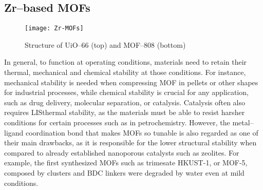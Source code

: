 \subsection{Zr--based MOFs}
\begin{figure}[!htbp]
	\centering
 	\texttt{[image: Zr-MOFs]}
	\caption{Structure of UiO--66 (top) and MOF--808 (bottom)}
	\label{fig:Zr-MOFs}
\end{figure}
In general, to function at operating conditions, materials need to retain their thermal, mechanical and chemical stability at those conditions. For instance, mechanical stability is needed when compressing MOF in pellets or other shapes for industrial processes\cite{chapman2009pressure}, while chemical stability is crucial for any application, such as drug delivery, molecular separation, or catalysis\cite{horcajada2010porous}. Catalysis often also requires LISthermal stability, as the materials must be able to resist harsher conditions for certain processes such as in petrochemistry. 
However, the metal--ligand coordination bond that makes MOFs so tunable is also regarded as one of their main drawbacks\cite{keskin2010can, canivet2014water, kizzie2011effect}, as it is responsible for the lower structural stability when compared to already established nanoporous catalysts such as zeolites. For example, the first synthesized MOFs such as  trimesate HKUST-1, or MOF-5, composed by  clusters and BDC linkers were degraded by water even at mild conditions\cite{greathouse2006interaction, low2009virtual, kaye2007impact, decoste2013effect}. 
\npar
